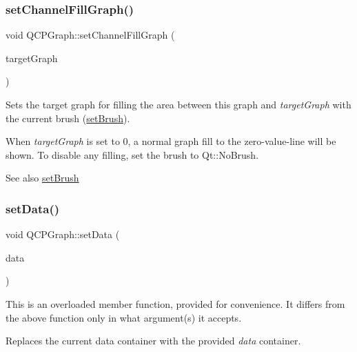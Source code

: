 \subsubsection{\texorpdfstring{setChannelFillGraph()}{setChannelFillGraph()}}
{\footnotesize\ttfamily void Q\+C\+P\+Graph\+::set\+Channel\+Fill\+Graph (\begin{DoxyParamCaption}\item[{\mbox{\hyperlink{class_q_c_p_graph}{Q\+C\+P\+Graph}} $\ast$}]{target\+Graph }\end{DoxyParamCaption})}

Sets the target graph for filling the area between this graph and {\itshape target\+Graph} with the current brush (\mbox{\hyperlink{class_q_c_p_abstract_plottable_a7a4b92144dca6453a1f0f210e27edc74}{set\+Brush}}).

When {\itshape target\+Graph} is set to 0, a normal graph fill to the zero-\/value-\/line will be shown. To disable any filling, set the brush to Qt\+::\+No\+Brush.

\begin{DoxySeeAlso}{See also}
\mbox{\hyperlink{class_q_c_p_abstract_plottable_a7a4b92144dca6453a1f0f210e27edc74}{set\+Brush}} 
\end{DoxySeeAlso}
\mbox{\label{class_q_c_p_graph_a1eae9429a316b008e2d99b2d65a54395}} 
\subsubsection{\texorpdfstring{setData()}{setData()}\hspace{0.1cm}{\footnotesize\ttfamily [1/2]}}
{\footnotesize\ttfamily void Q\+C\+P\+Graph\+::set\+Data (\begin{DoxyParamCaption}\item[{Q\+Shared\+Pointer$<$ \mbox{\hyperlink{qcustomplot_8h_a2e5583d1ae212f0deb10537cf975a15a}{Q\+C\+P\+Graph\+Data\+Container}} $>$}]{data }\end{DoxyParamCaption})}

This is an overloaded member function, provided for convenience. It differs from the above function only in what argument(s) it accepts.

Replaces the current data container with the provided {\itshape data} container.

